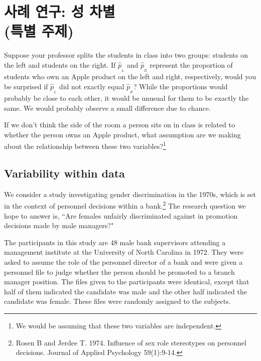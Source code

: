 \section[Case study: gender discrimination (special topic)]{사례 연구: 성 차별  \\(특별 주제)}
\label{caseStudyGenderDiscrimination}


\begin{example}{Suppose your professor splits the students in class into two groups: students on the left and students on the right. If $\hat{p}_{_L}$ and $\hat{p}_{_R}$ represent the proportion of students who own an Apple product on the left and right, respectively, would you be surprised if $\hat{p}_{_L}$ did not {exactly} equal $\hat{p}_{_R}$?}\label{classRightLeftSideApple}
While the proportions would probably be close to each other, it would be unusual for them to be exactly the same. We would probably observe a small difference due to {chance}.
\end{example}

\begin{exercise}
If we don't think the side of the room a person sits on in class is related to whether the person owns an Apple product, what assumption are we making about the relationship between these two variables?\footnote{We would be assuming that these two variables are independent.}
\end{exercise}

\subsection{Variability within data}
\label{variabilityWithinData}

We consider a study investigating gender discrimination in the 1970s, which is set in the context of personnel decisions within a bank.\footnote{Rosen B and Jerdee T. 1974. Influence of sex role stereotypes on personnel decisions. Journal of Applied Psychology 59(1):9-14.} The research question we hope to answer is, ``Are females unfairly discriminated against in promotion decisions made by male managers?"

The participants in this study are 48 male bank supervisors attending a management institute at the University of North Carolina in 1972. They were asked to assume the role of the personnel director of a bank and were given a personnel file to judge whether the person should be promoted to a branch manager position. The files given to the participants were identical, except that half of them indicated the candidate was male and the other half indicated the candidate was female. These files were randomly assigned to the subjects.

